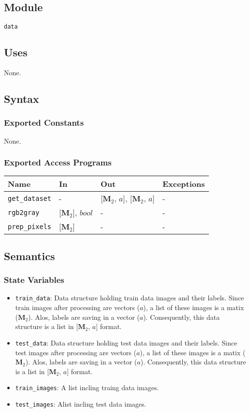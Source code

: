 \documentclass[12pt, titlepage]{article}
\def\code#1{\texttt{#1}}
\begin{document}
\subsection{Module}
\code{data} 

\subsection{Uses}
None.

\subsection{Syntax}
\subsubsection{Exported Constants}
None.

\subsubsection{Exported Access Programs}

\begin{center}
\begin{tabular}{p{3.5cm} p{4cm} p{6cm} p{2cm}}
\hline
\textbf{Name} & \textbf{In} & \textbf{Out} & \textbf{Exceptions} \\
\hline
\code{get\_dataset} & - & [$\mathbf{M}_{2}$, ${a}$], [$\mathbf{M}_{2}$, ${a}$] & - \\
\code{rgb2gray} & [$\mathbf{M}_{2}$], $bool$ & - & -\\
\code{prep\_pixels} & [$\mathbf{M}_{2}$] & - & -\\
\hline
\end{tabular}
\end{center}

\subsection{Semantics}

\subsubsection{State Variables}
\begin{itemize}
  \item \code{train\_data}: Data structure holding train data images and their labels. 
  Since train images after processing are vectors (${a}$), a list of these images is 
  a matix ($\mathbf{M}_{2}$). Alos, labels are saving in a vector (${a}$). 
  Consequently, this data structure is a list in [$\mathbf{M}_{2}$, ${a}$] format.
  \item \code{test\_data}: Data structure holding test data images and their labels. 
  Since test images after processing are vectors (${a}$), a list of these images is 
  a matix ($\mathbf{M}_{2}$). Alos, labels are saving in a vector (${a}$). 
  Consequently, this data structure is a list in [$\mathbf{M}_{2}$, ${a}$] format.
  \item \code{train\_images}: A list incling traing data images.
  \item \code{test\_images}:  Alist incling test data images.
\end{itemize}
\end{document}
